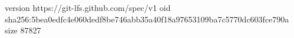version https://git-lfs.github.com/spec/v1
oid sha256:5bea0edfc4e060dedf8be746abb35a40f18a97653109ba7c5770dc603fce790a
size 87827
